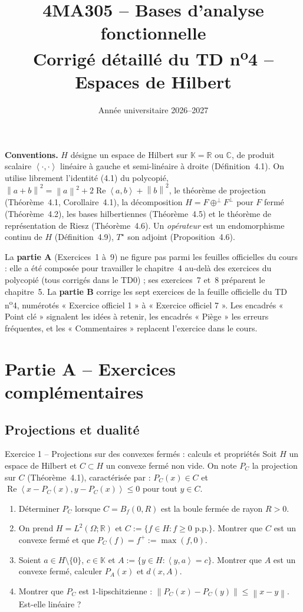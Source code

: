 \documentclass[11pt,a4paper]{article}
\title{\textbf{4MA305 -- Bases d'analyse fonctionnelle}\\[2mm]
\Large Corrigé détaillé du TD n\textsuperscript{o}4 -- Espaces de Hilbert}
\author{}
\date{Année universitaire 2026--2027}
\newcommand{\R}{\mathbb{R}}
\newcommand{\C}{\mathbb{C}}
\newcommand{\K}{\mathbb{K}}
\newcommand{\Bf}{B_f}
\newcommand{\norm}[1]{\left\|#1\right\|}
\newcommand{\ps}[2]{\left\langle #1,#2\right\rangle}
\renewcommand{\Re}{\operatorname{Re}}
\theoremstyle{definition}
\begin{document}
\maketitle

\begin{commentaire}
\textbf{Conventions.} $H$ désigne un espace de Hilbert sur $\K=\R$ ou $\C$, de produit scalaire $\ps\cdot\cdot$ linéaire à gauche et semi-linéaire à droite (Définition~4.1). On utilise librement l'identité (4.1) du polycopié, $\norm{a+b}^2=\norm a^2+2\Re\ps ab+\norm b^2$, le théorème de projection (Théorème~4.1, Corollaire~4.1), la décomposition $H=F\oplus^\perp F^\perp$ pour $F$ fermé (Théorème~4.2), les bases hilbertiennes (Théorème~4.5) et le théorème de représentation de Riesz (Théorème~4.6). Un \emph{opérateur} est un endomorphisme continu de $H$ (Définition~4.9), $T^\star$ son adjoint (Proposition~4.6).

La \textbf{partie A} (Exercices~1 à~9) ne figure pas parmi les feuilles officielles du cours : elle a été composée pour travailler le chapitre~4 au-delà des exercices du polycopié (tous corrigés dans le TD0) ; ses exercices~7 et~8 préparent le chapitre~5. La \textbf{partie B} corrige les sept exercices de la feuille officielle du TD n\textsuperscript{o}4, numérotés « Exercice officiel 1 » à « Exercice officiel 7 ». Les encadrés « Point clé » signalent les idées à retenir, les encadrés « Piège » les erreurs fréquentes, et les « Commentaires » replacent l'exercice dans le cours.
\end{commentaire}

\section*{Partie A -- Exercices complémentaires}
\subsection*{Projections et dualité}

\begin{exo}{Exercice 1 -- Projections sur des convexes fermés : calculs et propriétés}
Soit $H$ un espace de Hilbert et $C\subset H$ un convexe fermé non vide. On note $P_C$ la projection sur $C$ (Théorème~4.1), caractérisée par : $P_C(x)\in C$ et $\Re\ps{x-P_C(x)}{y-P_C(x)}\le0$ pour tout $y\in C$.
\begin{enumerate}[label=(\alph*)]
  \item Déterminer $P_C$ lorsque $C=\Bf(0,R)$ est la boule fermée de rayon $R>0$.
  \item On prend $H=L^2(\Omega;\R)$ et $C:=\{f\in H : f\ge0\text{ p.p.}\}$. Montrer que $C$ est un convexe fermé et que $P_C(f)=f^+:=\max(f,0)$.
  \item Soient $a\in H\setminus\{0\}$, $c\in\K$ et $A:=\{y\in H:\ps ya=c\}$. Montrer que $A$ est un convexe fermé, calculer $P_A(x)$ et $d(x,A)$.
  \item Montrer que $P_C$ est $1$-lipschitzienne : $\norm{P_C(x)-P_C(y)}\le\norm{x-y}$. Est-elle linéaire ?
\end{enumerate}
\end{exo}
\end{document}
